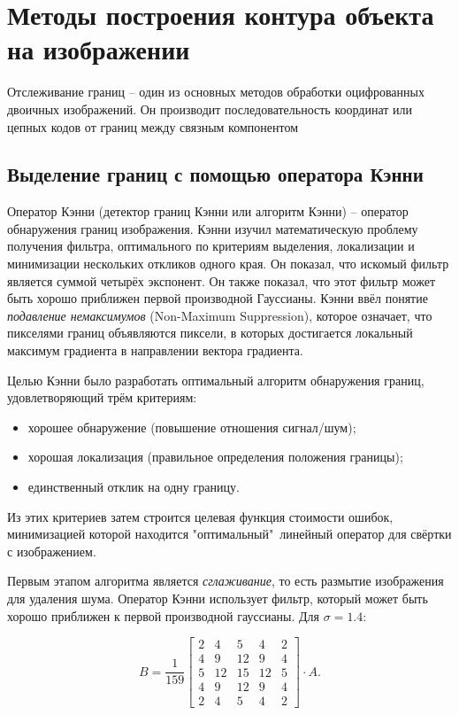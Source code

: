 \section{Методы построения контура объекта на изображении}

Отслеживание границ -- один из основных методов обработки оцифрованных
двоичных изображений. Он производит последовательность координат или 
цепных кодов от границ между связным компонентом

\subsection{Выделение границ с помощью оператора Кэнни}

Оператор Кэнни (детектор границ Кэнни или алгоритм Кэнни) -- оператор
обнаружения границ изображения. Кэнни изучил математическую проблему
получения фильтра, оптимального по критериям выделения, локализации и
минимизации нескольких откликов одного края. Он показал, что искомый
фильтр является суммой четырёх экспонент. Он также показал, что этот
фильтр может быть хорошо приближен первой производной Гауссианы. Кэнни
ввёл понятие {\it подавление немаксимумов} (Non-Maximum Suppression), 
которое означает, что пикселями границ объявляются пиксели, в которых
достигается локальный максимум градиента в направлении вектора
градиента.

Целью Кэнни было разработать оптимальный алгоритм обнаружения границ, 
удовлетворяющий трём критериям:
\begin{itemize}
	\item хорошее обнаружение (повышение отношения сигнал/шум);
	\item хорошая локализация (правильное определения положения
границы);
	\item единственный отклик на одну границу.
\end{itemize}

Из этих критериев затем строится целевая функция стоимости ошибок, 
минимизацией которой находится "оптимальный"\ линейный оператор для
свёртки с изображением.

Первым этапом алгоритма является {\it сглаживание}, то есть размытие
изображения для удаления шума. Оператор Кэнни использует фильтр, 
который может быть хорошо приближен к первой производной гауссианы.
Для $\sigma=1.4$:

\begin{equation}
	B = \frac{1}{159}
\begin{bmatrix}
	2 & 4 & 5 & 4 & 2\\
	4 & 9 & 12 & 9 & 4\\
	5 & 12 & 15 & 12 & 5\\
	4 & 9 & 12 & 9 & 4\\
	2 & 4 & 5 & 4 & 2
\end{bmatrix}
\cdot A.
\label{canny-1}
\end{equation}

